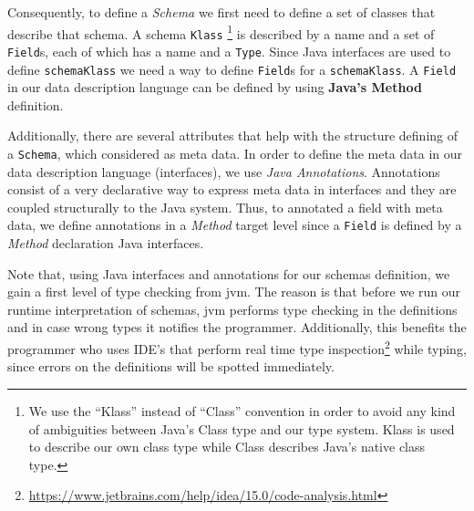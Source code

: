 Consequently, to define a \textit{Schema} we first need to define a set of classes that describe that schema.
A schema \texttt{Klass} \footnote{
	We use the ``Klass'' instead of ``Class'' convention in order to avoid any kind of ambiguities between Java's Class type and our type system. Klass is used to describe our own class type while Class describes Java's native class type.} 
is described by a name and a set of \texttt{Field}s, each of which has a name and a \texttt{Type}.
Since Java interfaces are used to define \texttt{schemaKlass} we need a way to define \texttt{Field}s for a \texttt{schemaKlass}.
A \texttt{Field} in our data description language can be defined by using \textbf{Java's Method} definition.

Additionally, there are several attributes that help with the structure defining of a \texttt{Schema}, which considered as meta data.
In order to define the meta data in our data description language (interfaces), we use \textit{Java Annotations}.
Annotations consist of a very declarative way to express meta data in interfaces and they are coupled structurally to the Java system.
Thus, to annotated a field with meta data, we define annotations in a \textit{Method} target level since a \texttt{Field} is defined by a \textit{Method} declaration Java interfaces.

Note that, using Java interfaces and annotations for our schemas definition, we gain a first level of type checking from \ac{jvm}. 
The reason is that before we run our runtime interpretation of schemas, \ac{jvm} performs type checking in the definitions and in case wrong types it notifies the programmer.
Additionally, this benefits the programmer who uses IDE's that perform real time type inspection\footnote{\url{https://www.jetbrains.com/help/idea/15.0/code-analysis.html}} while typing, since errors on the definitions will be spotted immediately. 

